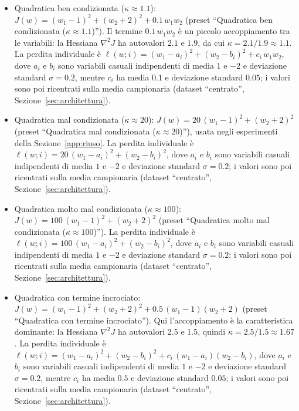 \documentclass[a4paper,12pt]{article}
\numberwithin{equation}{section}
\numberwithin{figure}{section}
\numberwithin{table}{section}
\begin{document}
\begin{itemize}
  \item Quadratica ben condizionata ($\kappa \approx 1.1$):
  $J(w) = (w_1 - 1)^2 + (w_2 + 2)^2 + 0.1\,w_1 w_2$ (preset ``Quadratica ben
  condizionata ($\kappa \approx 1.1$)''). Il termine $0.1\,w_1w_2$ è un piccolo
  accoppiamento tra le variabili: la Hessiana $\nabla^2 J$ ha autovalori $2.1$
  e $1.9$, da cui $\kappa = 2.1/1.9 \approx 1.1$. La perdita individuale è
  $\ell(w;i) = (w_1 - a_i)^2 + (w_2 - b_i)^2 + c_i\,w_1 w_2$, dove $a_i$ e $b_i$
  sono variabili casuali indipendenti di media $1$ e $-2$ e deviazione standard
  $\sigma = 0.2$, mentre $c_i$ ha media $0.1$ e deviazione standard $0.05$; i
  valori sono poi ricentrati sulla media campionaria (dataset ``centrato'',
  Sezione~\ref{sec:architettura}).
  \item Quadratica mal condizionata ($\kappa \approx 20$):
  $J(w) = 20\,(w_1 - 1)^2 + (w_2 + 2)^2$ (preset ``Quadratica mal condizionata
  ($\kappa \approx 20$)''), usata negli esperimenti della
  Sezione~\ref{app:riuso}. La perdita individuale è
  $\ell(w;i) = 20\,(w_1 - a_i)^2 + (w_2 - b_i)^2$, dove $a_i$ e $b_i$ sono
  variabili casuali indipendenti di media $1$ e $-2$ e deviazione standard
  $\sigma = 0.2$; i valori sono poi ricentrati sulla media campionaria (dataset
  ``centrato'', Sezione~\ref{sec:architettura}).
  \item Quadratica molto mal condizionata ($\kappa \approx 100$):
  $J(w) = 100\,(w_1 - 1)^2 + (w_2 + 2)^2$ (preset ``Quadratica molto mal
  condizionata ($\kappa \approx 100$)''). La perdita individuale è
  $\ell(w;i) = 100\,(w_1 - a_i)^2 + (w_2 - b_i)^2$, dove $a_i$ e $b_i$ sono
  variabili casuali indipendenti di media $1$ e $-2$ e deviazione standard
  $\sigma = 0.2$; i valori sono poi ricentrati sulla media campionaria (dataset
  ``centrato'', Sezione~\ref{sec:architettura}).
  \item Quadratica con termine incrociato:
  $J(w) = (w_1 - 1)^2 + (w_2 + 2)^2 + 0.5\,(w_1 - 1)(w_2 + 2)$ (preset
  ``Quadratica con termine incrociato''). Qui l'accoppiamento è la
  caratteristica dominante: la Hessiana $\nabla^2 J$ ha autovalori $2.5$ e
  $1.5$, quindi $\kappa = 2.5/1.5 \approx 1.67$. La perdita individuale è
  $\ell(w;i) = (w_1 - a_i)^2 + (w_2 - b_i)^2 + c_i\,(w_1 - a_i)(w_2 - b_i)$,
  dove $a_i$ e $b_i$ sono variabili casuali indipendenti di media $1$ e $-2$ e
  deviazione standard $\sigma = 0.2$, mentre $c_i$ ha media $0.5$ e deviazione
  standard $0.05$; i valori sono poi ricentrati sulla media campionaria (dataset
  ``centrato'', Sezione~\ref{sec:architettura}).

\end{itemize}
\end{document}
